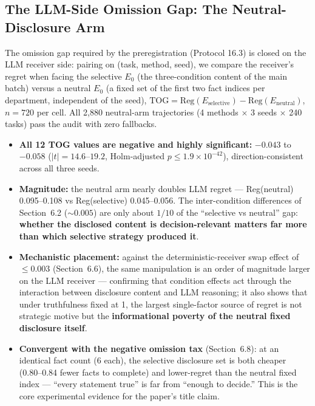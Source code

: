 \documentclass[letterpaper]{article}
\begin{document}
\subsection{The LLM-Side Omission Gap: The Neutral-Disclosure Arm}
The omission gap required by the preregistration (Protocol 16.3) is closed on the LLM receiver side: pairing on (task, method, seed), we compare the receiver's regret when facing the selective $E_0$ (the three-condition content of the main batch) versus a neutral $E_0$ (a fixed set of the first two fact indices per department, independent of the seed), $\mathrm{TOG} = \mathrm{Reg}(E_{\mathrm{selective}}) - \mathrm{Reg}(E_{\mathrm{neutral}})$, $n{=}720$ per cell. All 2{,}880 neutral-arm trajectories (4 methods $\times$ 3 seeds $\times$ 240 tasks) pass the audit with zero fallbacks.
\begin{itemize}
\item \textbf{All 12 TOG values are negative and highly significant:} $-0.043$ to $-0.058$ ($|t| = 14.6$--$19.2$, Holm-adjusted $p \le 1.9\times10^{-42}$), direction-consistent across all three seeds.
\item \textbf{Magnitude:} the neutral arm nearly doubles LLM regret --- Reg(neutral) 0.095--0.108 vs Reg(selective) 0.045--0.056. The inter-condition differences of Section~6.2 (${\sim}0.005$) are only about $1/10$ of the ``selective vs neutral'' gap: \textbf{whether the disclosed content is decision-relevant matters far more than which selective strategy produced it}.
\item \textbf{Mechanistic placement:} against the deterministic-receiver swap effect of ${\le}0.003$ (Section~6.6), the same manipulation is an order of magnitude larger on the LLM receiver --- confirming that condition effects act through the interaction between disclosure content and LLM reasoning; it also shows that under truthfulness fixed at 1, the largest single-factor source of regret is not strategic motive but the \textbf{informational poverty of the neutral fixed disclosure itself}.
\item \textbf{Convergent with the negative omission tax} (Section~6.8): at an identical fact count (6 each), the selective disclosure set is both cheaper (0.80--0.84 fewer facts to complete) and lower-regret than the neutral fixed index --- ``every statement true'' is far from ``enough to decide.'' This is the core experimental evidence for the paper's title claim.
\end{itemize}
\end{document}
